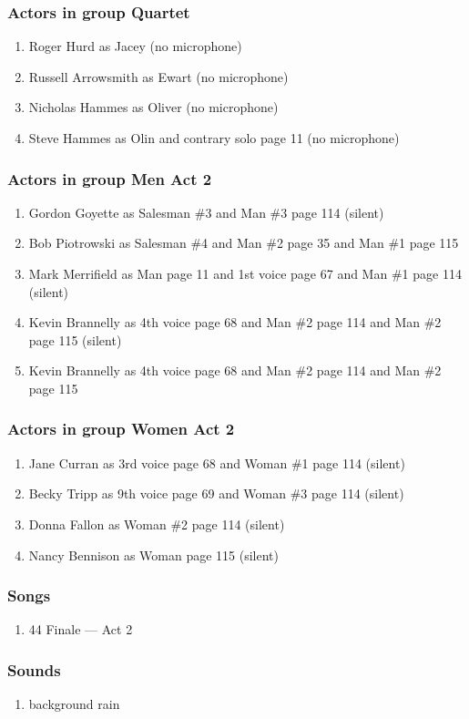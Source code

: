 \subsubsection{Actors in group Quartet}
\begin{enumerate}
\item Roger Hurd as Jacey (no microphone)
\item Russell Arrowsmith as Ewart (no microphone)
\item Nicholas Hammes as Oliver (no microphone)
\item Steve Hammes as Olin and contrary solo page 11 (no microphone)
\end{enumerate}
\subsubsection{Actors in group Men Act 2}
\begin{enumerate}
\item Gordon Goyette as Salesman \#3 and Man \#3 page 114 (silent)
\item Bob Piotrowski as Salesman \#4 and Man \#2 page 35 and Man \#1 page 115
\item Mark Merrifield as Man page 11 and 1st voice page 67 and Man \#1 page 114 (silent)
\item Kevin Brannelly as 4th voice page 68 and Man \#2 page 114 and Man \#2 page 115 (silent)
\item Kevin Brannelly as 4th voice page 68 and Man \#2 page 114 and Man \#2 page 115
\end{enumerate}
\subsubsection{Actors in group Women Act 2}
\begin{enumerate}
\item Jane Curran as 3rd voice page 68 and Woman \#1 page 114 (silent)
\item Becky Tripp as 9th voice page 69 and Woman \#3 page 114 (silent)
\item Donna Fallon as Woman \#2 page 114 (silent)
\item Nancy Bennison as Woman page 115 (silent)
\end{enumerate}

\subsubsection{Songs}
\begin{enumerate}
\item 44 Finale --- Act 2
\end{enumerate}\subsubsection{Sounds}
\begin{enumerate}
\item background rain
\end{enumerate}
